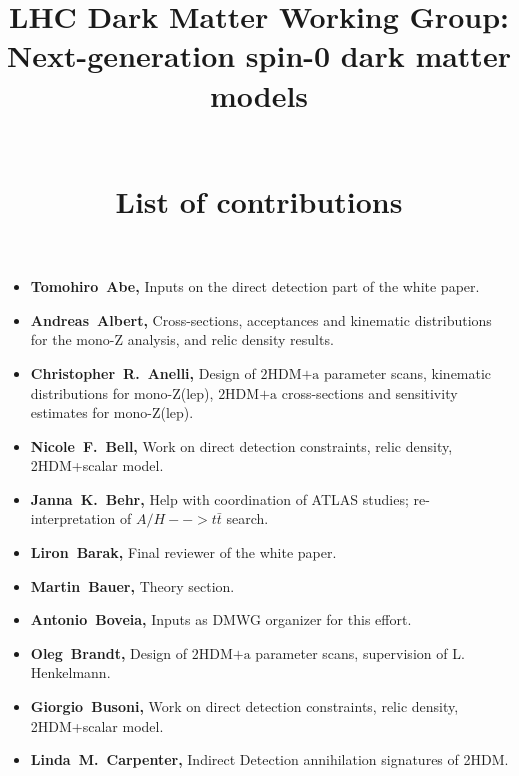\documentclass[a4paper, 11pt,notoc]{article}
\newcommand{\hdma}{\ensuremath{\textrm{2HDM+a}}\xspace}
\begin{document}
\title{\begin{boldmath} \huge LHC Dark Matter Working Group:  \\ Next-generation spin-0  dark matter models \vspace{7mm} \end{boldmath} \\ List of contributions}

\maketitle

\begin{itemize}

\item \textbf{Tomohiro~Abe,} Inputs on the direct detection part of the white paper. 

\item \textbf{Andreas~Albert,} Cross-sections, acceptances and kinematic distributions for the mono-Z analysis, and relic density results.

\item \textbf{Christopher~R.~Anelli,} Design of \hdma parameter scans,  kinematic distributions for mono-Z(lep), \hdma cross-sections and sensitivity estimates for mono-Z(lep).

\item \textbf{Nicole~F.~Bell,} Work on direct detection constraints, relic density, 2HDM+scalar model.

\item \textbf{Janna~K.~Behr,} Help with coordination of ATLAS studies; re-interpretation of $A/H-->t\bar{t}$ search.

\item \textbf{Liron~Barak,} Final reviewer of the white paper. 

\item \textbf{Martin~Bauer,} Theory section. 

\item \textbf{Antonio~Boveia,} Inputs as DMWG organizer for this effort. 

\item \textbf{Oleg~Brandt,} Design of \hdma parameter scans, supervision of L. Henkelmann. 

\item \textbf{Giorgio~Busoni,} Work on direct detection constraints, relic density, 2HDM+scalar model.

\item \textbf{Linda~M.~Carpenter,} Indirect Detection annihilation signatures of 2HDM.


\end{itemize}
\end{document}
